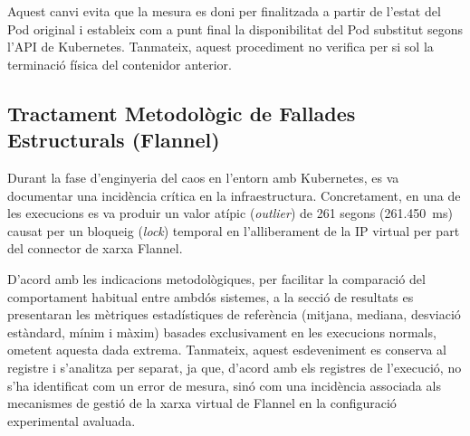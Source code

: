 Aquest canvi evita que la mesura es doni per finalitzada a partir de l'estat del Pod original i estableix com a punt final la disponibilitat del Pod substitut segons l'API de Kubernetes. Tanmateix, aquest procediment no verifica per si sol la terminació física del contenidor anterior.

\subsection{Tractament Metodològic de Fallades Estructurals (Flannel)}

Durant la fase d'enginyeria del caos en l'entorn amb Kubernetes, es va documentar una incidència crítica en la infraestructura. Concretament, en una de les execucions es va produir un valor atípic (\textit{outlier}) de 261 segons (261.450~ms) causat per un bloqueig (\textit{lock}) temporal en l'alliberament de la IP virtual per part del connector de xarxa Flannel. 

D'acord amb les indicacions metodològiques, per facilitar la comparació del comportament habitual entre ambdós sistemes, a la secció de resultats es presentaran les mètriques estadístiques de referència (mitjana, mediana, desviació estàndard, mínim i màxim) basades exclusivament en les execucions normals, ometent aquesta dada extrema. 
Tanmateix, aquest esdeveniment es conserva al registre i s'analitza per separat, ja que, d'acord amb els registres de l'execució, no s'ha identificat com un error de mesura, sinó com una incidència associada als mecanismes de gestió de la xarxa virtual de Flannel en la configuració experimental avaluada.